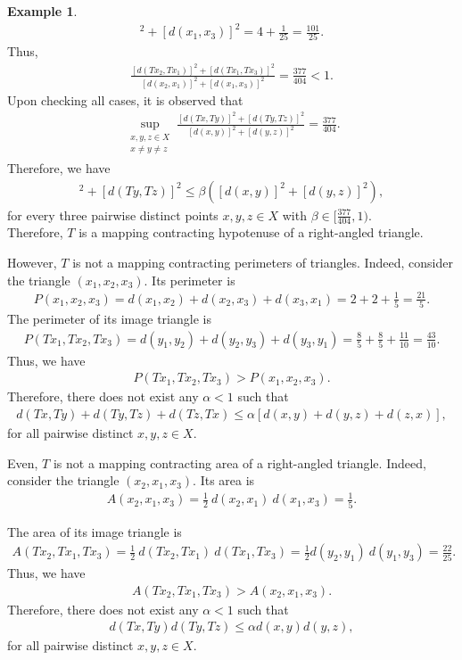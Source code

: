 \documentclass[11pt,reqno,a4paper]{amsart}
\theoremstyle{plain}
\theoremstyle{definition}
\newtheorem{example}[theorem]{Example}
\theoremstyle{remark}
\numberwithin{equation}{section}
\begin{document}
\begin{example}
\begin{align*}
   [d(x_2,x_1)]^2+[d(x_1,x_3)]^2 =4+\frac{1}{25} =\frac{101}{25}. 
\end{align*}
Thus,
\begin{align*}
    \frac{[d(Tx_2,Tx_1)]^2+[d(Tx_1,Tx_3)]^2}{[d(x_2,x_1)]^2+[d(x_1,x_3)]^2}
    =\frac{377}{404}<1.
\end{align*}
Upon checking all cases, it is observed that  
\begin{align*}
    \sup_{\substack{x,y,z\in X\\
x \neq y \neq z}}
\frac{[d(Tx,Ty)]^2+[d(Ty,Tz)]^2}{[d(x,y)]^2+[d(y,z)]^2}
=\frac{377}{404}.
\end{align*}
Therefore, we have
\begin{align*}
    [d(Tx,Ty)]^2+[d(Ty,Tz)]^2 \leq \beta \left([d(x,y)]^2+[d(y,z)]^2 \right),
\end{align*}
for every three pairwise distinct points $x,y,z\in X$ with $\beta \in [\frac{377}{404}, 1)$.\\
Therefore, $T$ is a mapping contracting hypotenuse of a right-angled triangle.

However, $T$ is not a mapping contracting perimeters of triangles.
Indeed, consider the triangle $(x_1,x_2,x_3)$. Its perimeter is
\begin{align*}
P(x_1,x_2,x_3)
=d(x_1,x_2)+d(x_2,x_3)+d(x_3,x_1)
=2+2+\frac{1}{5}
=\frac{21}{5}.
\end{align*}
The perimeter of its image triangle is
\begin{align*}
P(Tx_1,Tx_2,Tx_3)
=d(y_1,y_2)+d(y_2,y_3)+d(y_3,y_1)
=\frac{8}{5}+\frac{8}{5}+\frac{11}{10}
=\frac{43}{10}.
\end{align*}
Thus, we have
\begin{align*}
    P(Tx_1,Tx_2,Tx_3)>P(x_1,x_2,x_3).
\end{align*}
Therefore, there does not exist any $\alpha<1$ such that
\begin{align*}
    d(Tx,Ty)+d(Ty,Tz)+d(Tz,Tx) \leq \alpha [d(x,y)+d(y,z)+d(z,x)],
\end{align*}
for all pairwise distinct $x,y,z\in X$.

Even, $T$ is not a mapping contracting area of a right-angled triangle.
Indeed, consider the triangle $(x_2,x_1,x_3)$. Its area is
\begin{align*}
A(x_2,x_1,x_3)
= \frac{1}{2} \ d(x_2,x_1)\ d(x_1,x_3)
=\frac{1}{5}.
\end{align*}

The area of its image triangle is
\begin{align*}
A(Tx_2,Tx_1,Tx_3)
= \frac{1}{2}\ d(Tx_2,Tx_1)\ d(Tx_1,Tx_3)
=\frac{1}{2} d(y_2,y_1)\ d(y_1,y_3)
=\frac{22}{25}.
\end{align*}
Thus, we have
\begin{align*}
   A(Tx_2,Tx_1,Tx_3) > A(x_2,x_1,x_3). 
\end{align*}
Therefore, there does not exist any $\alpha<1$ such that
\begin{align*}
    d(Tx,Ty)d(Ty,Tz) \leq \alpha d(x,y)d(y,z),
\end{align*}
for all pairwise distinct $x,y,z\in X$.


\end{example}
\end{document}
